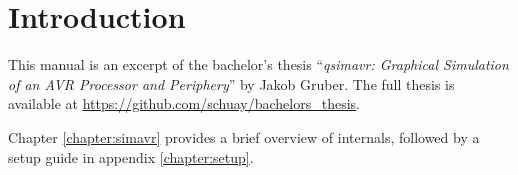 \chapter{Introduction}

This manual is an excerpt of the bachelor's thesis ``\emph{qsimavr: Graphical
Simulation of an AVR Processor and Periphery}'' by Jakob Gruber. The full thesis is available at \url{https://github.com/schuay/bachelors_thesis}.

Chapter \ref{chapter:simavr} provides a brief overview of
\simavr internals, followed by a setup guide in appendix \ref{chapter:setup}.
